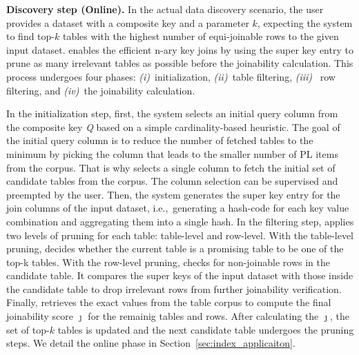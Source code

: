 \noindent\textbf{Discovery step (Online).} In the actual data discovery scenario, the user provides a dataset with a composite key and a parameter $k$, expecting the system to find top-$k$ tables with the highest number of equi-joinable rows to the given input dataset.
\system enables the efficient n-ary key joins by using the super key entry to prune as many irrelevant tables as possible before the joinability calculation.
This process undergoes four phases: \textit{(i)}~initialization, \textit{(ii)}~table filtering, \textit{(iii)}~ row filtering, and \textit{(iv)}~the joinability calculation.

In the initialization step, first, the system selects an initial query column from the composite key \textit{Q} based on a simple cardinality-based heuristic. The goal of the initial query column is to reduce the number of fetched tables to the minimum by picking the column that leads to the smaller number of PL items from the corpus. 
That is why \system selects a single column to fetch the initial set of candidate tables from the corpus.
The column selection can be supervised and preempted by the user.
Then, the system generates the super key entry for the join columns of the input dataset, i.e.,~generating a hash-code for each key value combination and aggregating them into a single hash. 
In the filtering step, \system applies two levels of pruning for each table: table-level and row-level. 
With the table-level pruning, \system decides whether the current table is a promising table to be one of the top-k tables.
With the row-level pruning, \system checks for non-joinable rows in the candidate table. It compares the super keys of the input dataset with those inside the candidate table to drop irrelevant rows from further joinability verification.
Finally, \system retrieves the exact values from the table corpus to compute the final joinability score $\jmath$ for the remainig tables and rows. After calculating the $\jmath$, the set of top-$k$ tables is updated and the next candidate table undergoes the pruning steps.
We detail the online phase in Section~\ref{sec:index_applicaiton}.

